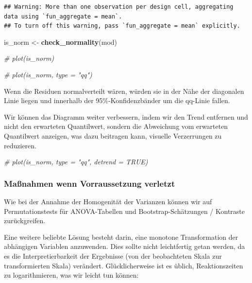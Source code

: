 \documentclass[
]{book}
\newenvironment{Shaded}{\begin{snugshade}}{\end{snugshade}}
\newcommand{\CommentTok}[1]{\textcolor[rgb]{0.56,0.35,0.01}{\textit{#1}}}
\newcommand{\FunctionTok}[1]{\textcolor[rgb]{0.13,0.29,0.53}{\textbf{#1}}}
\newcommand{\NormalTok}[1]{#1}
\newcommand{\OtherTok}[1]{\textcolor[rgb]{0.56,0.35,0.01}{#1}}
\begin{document}
\begin{verbatim}
## Warning: More than one observation per design cell, aggregating data using `fun_aggregate = mean`.
## To turn off this warning, pass `fun_aggregate = mean` explicitly.
\end{verbatim}

\begin{Shaded}
\begin{Highlighting}[]
\NormalTok{is\_norm }\OtherTok{\textless{}{-}} \FunctionTok{check\_normality}\NormalTok{(mod)}

\CommentTok{\# plot(is\_norm)}
\end{Highlighting}
\end{Shaded}

\begin{Shaded}
\begin{Highlighting}[]
\CommentTok{\# plot(is\_norm, type = "qq")}
\end{Highlighting}
\end{Shaded}

Wenn die Residuen normalverteilt wären, würden sie in der Nähe der diagonalen Linie liegen und innerhalb der 95\%-Konfidenzbänder um die qq-Linie fallen.

Wir können das Diagramm weiter verbessern, indem wir den Trend entfernen und nicht den erwarteten Quantilwert, sondern die Abweichung vom erwarteten Quantilwert anzeigen, was dazu beitragen kann, visuelle Verzerrungen zu reduzieren.

\begin{Shaded}
\begin{Highlighting}[]
\CommentTok{\# plot(is\_norm, type = "qq", detrend = TRUE)}
\end{Highlighting}
\end{Shaded}

\subsubsection{Maßnahmen wenn Vorraussetzung verletzt}\label{mauxdfnahmen-wenn-vorraussetzung-verletzt-2}

Wie bei der Annahme der Homogenität der Varianzen können wir auf Permutationstests für ANOVA-Tabellen und Bootstrap-Schätzungen / Kontraste zurückgreifen.

Eine weitere beliebte Lösung besteht darin, eine monotone Transformation der abhängigen Variablen anzuwenden. Dies sollte nicht leichtfertig getan werden, da es die Interpretierbarkeit der Ergebnisse (von der beobachteten Skala zur transformierten Skala) verändert. Glücklicherweise ist es üblich, Reaktionszeiten zu logarithmieren, was wir leicht tun können:
\end{document}
